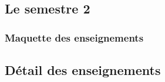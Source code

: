 \documentclass[10pt, a5paper]{report}
\begin{document}
\begin{spacing}{1.0}
\subsection*{Le semestre 2}

\subsubsection*{Maquette des enseignements}



\subsection*{Détail des enseignements}

\end{spacing}
\end{document}
